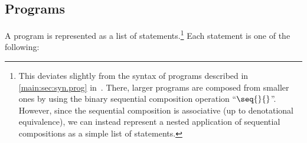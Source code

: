 \documentclass{article}
\newcommand\qrhlautoref[1]{\autoref*{main:#1} in~\cite{qrhl-paper-from-manual}}
\begin{document}

\subsection{Programs}
\label{sec:tool.programs}

A program is represented as a list of statements.\footnote{This
  deviates slightly from the syntax of programs described in
  \qrhlautoref{sec:syn.prog}. There, larger programs are composed from
  smaller ones by using the binary sequential composition operation
  ``$\seq{}{}$''.
  However, since the sequential composition is associative (up to
  denotational equivalence), we can instead represent a nested
  application of sequential compositions as a simple list of
  statements.} Each statement is one of the following:

\newcommand\toolprog[1]{\index{#1@\textttOLD{#1} (tool program syntax)}}
\end{document}
